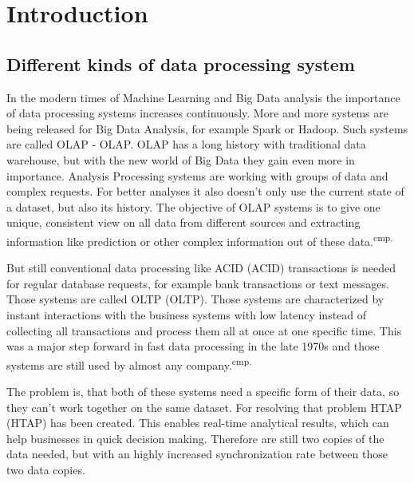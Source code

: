 
\chapter{Introduction}

\section{Different kinds of data processing system}

In the modern times of Machine Learning and Big Data analysis the importance of data processing systems increases continuously. More and more systems are being released for Big Data Analysis, for example Spark or Hadoop. Such systems are called \acs{OLAP} - \acl{OLAP}. OLAP has a long history with traditional data warehouse, but with the new world of Big Data they gain even more in importance. Analysis Processing systems are working with groups of data and complex requests. For better analyses it also doesn't only use the current state of a dataset, but also its history. The objective of OLAP systems is to give one unique, consistent view on all data from different sources and extracting information like prediction or other complex information out of these data.\textsuperscript{cmp.\cite{5}}


But still conventional data processing like \acs{ACID} (\acl{ACID}) transactions is needed for regular database requests, for example bank transactions or text messages. Those systems are called \acs{OLTP} (\acl{OLTP}). Those systems are characterized by instant interactions with the business systems with low latency instead of collecting all transactions and process them all at once at one specific time. This was a major step forward in fast data processing in the late 1970s and those systems are still used by almost any company.\textsuperscript{cmp.\cite{6}}


The problem is, that both of these systems need a specific form of their data, so they can't work together on the same dataset. For resolving that problem \acs{HTAP} (\acl{HTAP}) has been created. This enables real-time analytical results, which can help businesses in quick decision making. Therefore are still two copies of the data needed, but with an highly increased synchronization rate between those two data copies.

